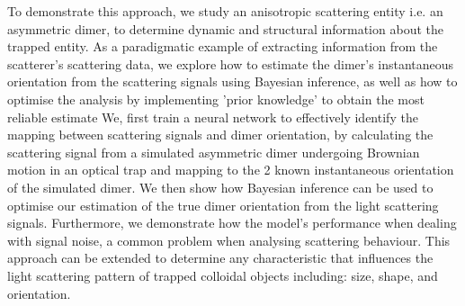 \documentclass[preprint,  3p]{elsarticle}
\begin{document}
To demonstrate this approach, we study an anisotropic scattering entity i.e. an asymmetric dimer, to determine dynamic and structural information about the trapped entity. As a paradigmatic example of extracting information from the scatterer’s scattering data, we explore how to estimate the dimer's instantaneous orientation from the scattering signals using Bayesian inference, as well as how to optimise the analysis by implementing 'prior knowledge' to obtain the most reliable estimate We, first train a neural network to effectively identify the mapping between scattering signals and dimer orientation, by calculating the scattering signal from a simulated asymmetric dimer undergoing Brownian motion in an optical trap and mapping to the 2 known instantaneous orientation of the simulated dimer. We then show how Bayesian inference can be used to optimise our estimation of the true dimer orientation from the light scattering signals. Furthermore, we demonstrate how the model's performance when dealing with signal noise, a common problem when analysing scattering behaviour. This approach can be extended to determine any characteristic that influences the light scattering pattern of trapped colloidal objects including: size, shape, and orientation. 
\end{document}
